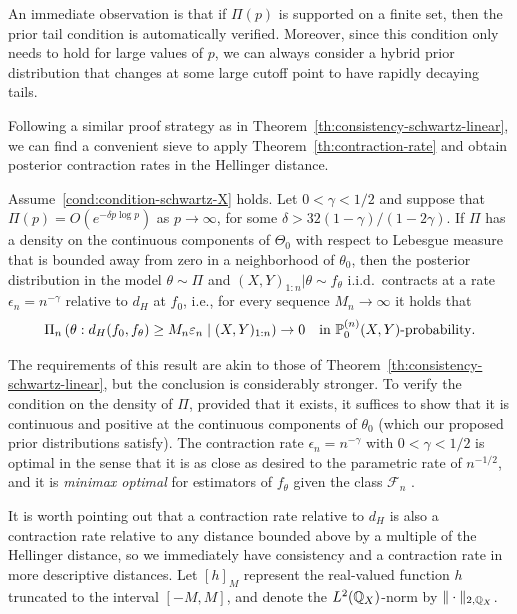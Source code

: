 An immediate observation is that if \(\Pi(p)\) is supported on a finite set, then the prior tail condition is automatically verified. Moreover, since this condition only needs to hold for large values of \(p\), we can always consider a hybrid prior distribution that changes at some large cutoff point to have rapidly decaying tails.

Following a similar proof strategy as in Theorem~\ref{th:consistency-schwartz-linear}, we can find a convenient sieve to apply Theorem~\ref{th:contraction-rate} and obtain posterior contraction rates in the Hellinger distance.

\begin{theorem}\label{th:contraction-rate-schwartz-linear}
Assume~\ref{cond:condition-schwartz-X} holds. Let \(0<\gamma<1/2\) and suppose that \(\Pi(p)=O(e^{-\delta p \log p})\) as \(p\to\infty\), for some \(\delta>32(1-\gamma)/(1-2\gamma)\). If \(\Pi\) has a density on the continuous components of \(\Theta_0\) with respect to Lebesgue measure that is bounded away from zero in a neighborhood of \(\theta_0\), then the posterior distribution in the model \(\theta \sim \Pi\) and \((X,Y)_{1:n}|\theta \sim f_\theta\) i.i.d.\ contracts at a rate \(\epsilon_n= n^{-\gamma}\) relative to \(d_H\) at \(f_0\), i.e., for every sequence \(M_n\to\infty\) it holds that
\[
    \Pi_n\left(\theta: d_H(f_0, f_\theta) \geq M_n \varepsilon_n \mid (X,Y)_{1:n}\right) \to 0 \quad \text{in } \mathbb{P}_0^{(n)}(X,Y)\text{-probability}.
    \]
\end{theorem}

The requirements of this result are akin to those of Theorem~\ref{th:consistency-schwartz-linear}, but the conclusion is considerably stronger. To verify the condition on the density of \(\Pi\), provided that it exists, it suffices to show that it is continuous and positive at the continuous components of \(\theta_0\) (which our proposed prior distributions satisfy). The contraction rate \(\epsilon_n=n^{-\gamma}\) with \(0<\gamma<1/2\) is optimal in the sense that it is as close as desired to the parametric rate of \(n^{-1/2}\), and it is \textit{minimax optimal} for estimators of \(f_\theta\) given the class \(\mathcal F_n\) \citep[see][p.~198 and references therein]{ghosal2017fundamentals}.

It is worth pointing out that a contraction rate relative to \(d_H\) is also a contraction rate relative to any distance bounded above by a multiple of the Hellinger distance, so we immediately have consistency and a contraction rate in more descriptive distances. Let \([h]_M\) represent the real-valued function \(h\) truncated to the interval \([-M, M]\), and denote the \(L^2(\mathbb{Q}_X)\)-norm by \(\|\cdot\|_{2,\mathbb{Q}_X}\).

